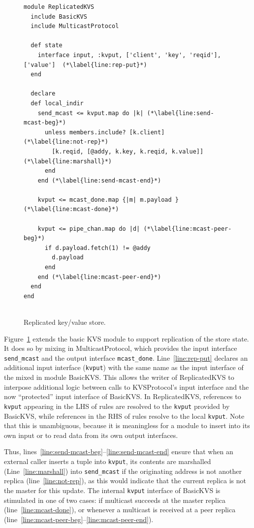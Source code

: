 \begin{figure}[t]
\begin{scriptsize}
\begin{lstlisting}
module ReplicatedKVS
  include BasicKVS
  include MulticastProtocol

  def state
    interface input, :kvput, ['client', 'key', 'reqid'], ['value']  (*\label{line:rep-put}*)
  end

  declare
  def local_indir
    send_mcast <= kvput.map do |k| (*\label{line:send-mcast-beg}*)
      unless members.include? [k.client]  (*\label{line:not-rep}*)
        [k.reqid, [@addy, k.key, k.reqid, k.value]]   (*\label{line:marshall}*)            
      end
    end (*\label{line:send-mcast-end}*)
    
    kvput <= mcast_done.map {|m| m.payload }  (*\label{line:mcast-done}*)

    kvput <= pipe_chan.map do |d| (*\label{line:mcast-peer-beg}*)
      if d.payload.fetch(1) != @addy
        d.payload
      end
    end (*\label{line:mcast-peer-end}*)
  end
end


\end{lstlisting}
\vspace{-10pt}
\caption{Replicated key/value store.}
\label{fig:kvs-repl}
\end{scriptsize}
\vspace{-2pt}
\end{figure}


Figure~\ref{fig:kvs-repl} extends the basic KVS module to support replication of the store
state.  It does so by mixing in MulticastProtocol, which provides the input interface 
\texttt{send\_mcast} and the output interface \texttt{mcast\_done}.  Line~\ref{line:rep-put}
declares an additional input interface (\texttt{kvput}) with the same name as the input
interface of the mixed in module BasicKVS.  This allows the writer of ReplicatedKVS to 
interpose additional logic between calls to KVSProtocol's input interface and the now 
``protected'' input interface of BasicKVS.  In ReplicatedKVS, references to \texttt{kvput}
appearing in the LHS of rules are resolved to the \texttt{kvput} provided by BasicKVS, 
while references in the RHS of rules resolve to the local \texttt{kvput}.
Note that this is unambiguous, because it is meaningless for a module to insert into its own input or to read data from its own output interfaces.

Thus, lines~\ref{line:send-mcast-beg}--\ref{line:send-mcast-end} ensure that when an external caller inserts a tuple into
\texttt{kvput}, its contents are marshalled (Line~\ref{line:marshall}) into \texttt{send\_mcast}
if the originating address is not another replica (line~\ref{line:not-rep}), as this would indicate
that the current replica is not the master for this update.  
The internal
\texttt{kvput} interface of BasicKVS is stimulated in one of two cases: if multicast succeeds
at the master replica (line~\ref{line:mcast-done}), or whenever a multicast is received at 
a peer replica (line~\ref{line:mcast-peer-beg}--\ref{line:mcast-peer-end}).

